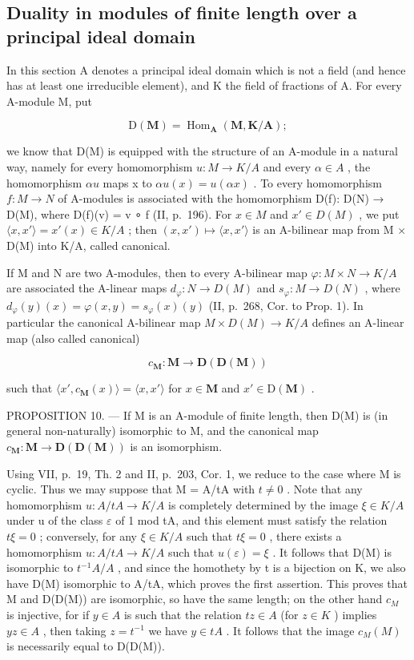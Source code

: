 \subsection{Duality in modules of finite length over a principal ideal domain}

In this section A denotes a principal ideal domain which is not a field (and hence has at least one irreducible element), and K the field of fractions of A. For every A-module M, put

\[
\mathrm{D} (\mathbf {M}) = \operatorname{Hom} _ {\mathbf {A}} (\mathbf {M}, \mathbf {K} / \mathbf {A});
\]

we know that D(M) is equipped with the structure of an A-module in a natural way, namely for every homomorphism \(u: M \to K/A\) and every \(\alpha \in A\) , the homomorphism \(\alpha u\) maps x to \(\alpha u(x) = u(\alpha x)\) . To every homomorphism \(f: M \to N\) of A-modules is associated with the homomorphism D(f): D(N) → D(M), where D(f)(v) = v ∘ f (II, p.~196). For \(x \in M\) and \(x' \in D(M)\) , we put \(\langle x, x' \rangle = x'(x) \in K/A\) ; then \((x, x') \mapsto \langle x, x' \rangle\) is an A-bilinear map from M × D(M) into K/A, called canonical.

If M and N are two A-modules, then to every A-bilinear map \(\varphi: M \times N \to K/A\) are associated the A-linear maps \(d_{\varphi}: N \to D(M)\) and \(s_{\varphi}: M \to D(N)\) , where \(d_{\varphi}(y)(x) = \varphi(x, y) = s_{\varphi}(x)(y)\) (II, p.~268, Cor. to Prop. 1). In particular the canonical A-bilinear map \(M \times D(M) \to K/A\) defines an A-linear map (also called canonical)

\[
c _ {\mathbf {M}}: \mathbf {M} \rightarrow \mathbf {D} (\mathbf {D} (\mathbf {M}))
\]

such that \(\langle x', c_{\mathbf{M}}(x) \rangle = \langle x, x' \rangle\) for \(x \in \mathbf{M}\) and \(x' \in \mathrm{D}(\mathbf{M})\) .

PROPOSITION 10. --- If M is an A-module of finite length, then D(M) is (in general non-naturally) isomorphic to M, and the canonical map \(c_{\mathbf{M}}: \mathbf{M} \to \mathbf{D}(\mathbf{D}(\mathbf{M}))\) is an isomorphism.

Using VII, p.~19, Th. 2 and II, p.~203, Cor. 1, we reduce to the case where M is cyclic. Thus we may suppose that M = A/tA with \(t \neq 0\) . Note that any homomorphism \(u: A/tA \to K/A\) is completely determined by the image \(\xi \in K/A\) under u of the class \(\varepsilon\) of 1 mod tA, and this element must satisfy the relation \(t\xi = 0\) ; conversely, for any \(\xi \in K/A\) such that \(t\xi = 0\) , there exists a homomorphism \(u: A/tA \to K/A\) such that \(u(\varepsilon) = \xi\) . It follows that D(M) is isomorphic to \(t^{-1}A/A\) , and since the homothety by t is a bijection on K, we also have D(M) isomorphic to A/tA, which proves the first assertion. This proves that M and D(D(M)) are isomorphic, so have the same length; on the other hand \(c_{M}\) is injective, for if \(y \in A\) is such that the relation \(tz \in A\) (for \(z \in K\) ) implies \(yz \in A\) , then taking \(z = t^{-1}\) we have \(y \in tA\) . It follows that the image \(c_{M}(M)\) is necessarily equal to D(D(M)).

